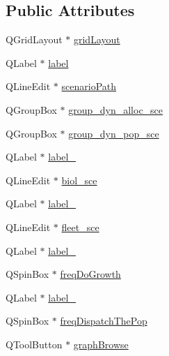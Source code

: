 \subsection*{Public Attributes}
\begin{DoxyCompactItemize}
\item 
Q\+Grid\+Layout $\ast$ \mbox{\hyperlink{class_ui___scenario_dialog_a592eefa5b303aa90ca2ea4b67ebd2b43}{grid\+Layout}}
\item 
Q\+Label $\ast$ \mbox{\hyperlink{class_ui___scenario_dialog_aebe63a3d89583dbaeb38957b8840b836}{label}}
\item 
Q\+Line\+Edit $\ast$ \mbox{\hyperlink{class_ui___scenario_dialog_a5e6c7a4470198552a9e6bc0dfe61e236}{scenario\+Path}}
\item 
Q\+Group\+Box $\ast$ \mbox{\hyperlink{class_ui___scenario_dialog_ad662327f13800920158e4991fff2b31d}{group\+\_\+dyn\+\_\+alloc\+\_\+sce}}
\item 
Q\+Group\+Box $\ast$ \mbox{\hyperlink{class_ui___scenario_dialog_ac7e87ba1ada016ebf911d4bf3d4589ab}{group\+\_\+dyn\+\_\+pop\+\_\+sce}}
\item 
Q\+Label $\ast$ \mbox{\hyperlink{class_ui___scenario_dialog_a7872dbba3256d24b8d556392a76c25eb}{label\+\_}}
\item 
Q\+Line\+Edit $\ast$ \mbox{\hyperlink{class_ui___scenario_dialog_af543386247d07a1136c7ac0a934bb68a}{biol\+\_\+sce}}
\item 
Q\+Label $\ast$ \mbox{\hyperlink{class_ui___scenario_dialog_ae89edda4e1395d3b18b0eb83ae844a5c}{label\+\_}}
\item 
Q\+Line\+Edit $\ast$ \mbox{\hyperlink{class_ui___scenario_dialog_a8a1a3d78b3b97ca77531e4c1874a3aff}{fleet\+\_\+sce}}
\item 
Q\+Label $\ast$ \mbox{\hyperlink{class_ui___scenario_dialog_a9b33b4be0061d90bf0ed98ba9bc01884}{label\+\_}}
\item 
Q\+Spin\+Box $\ast$ \mbox{\hyperlink{class_ui___scenario_dialog_a3a2a798088a04378aa925a1488fd0136}{freq\+Do\+Growth}}
\item 
Q\+Label $\ast$ \mbox{\hyperlink{class_ui___scenario_dialog_a3acb51d3f7756e5267823264c6a59b5a}{label\+\_}}
\item 
Q\+Spin\+Box $\ast$ \mbox{\hyperlink{class_ui___scenario_dialog_a26e8f8464bc41938f50ae7ba90d23d15}{freq\+Dispatch\+The\+Pop}}
\item 
Q\+Tool\+Button $\ast$ \mbox{\hyperlink{class_ui___scenario_dialog_a6bd1f77b3854d8b3a9aa69e3eabf8d0a}{graph\+Browse}}
\item 

\end{DoxyCompactItemize}

